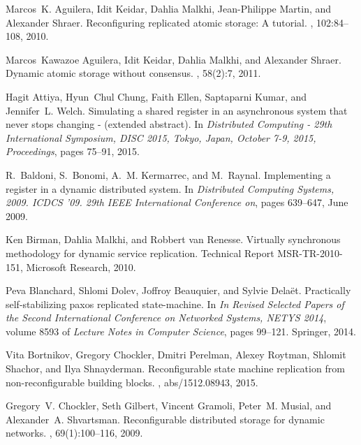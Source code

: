 \documentclass[11pt]{article}
\begin{document}
\begin{thebibliography}{10}

Marcos~K. Aguilera, Idit Keidar, Dahlia Malkhi, Jean{-}Philippe Martin, and
  Alexander Shraer.
\newblock Reconfiguring replicated atomic storage: {A} tutorial.
, 102:84--108, 2010.

Marcos~Kawazoe Aguilera, Idit Keidar, Dahlia Malkhi, and Alexander Shraer.
\newblock Dynamic atomic storage without consensus.
, 58(2):7, 2011.

Hagit Attiya, Hyun~Chul Chung, Faith Ellen, Saptaparni Kumar, and Jennifer~L.
  Welch.
\newblock Simulating a shared register in an asynchronous system that never
  stops changing - (extended abstract).
\newblock In {\em Distributed Computing - 29th International Symposium, {DISC}
  2015, Tokyo, Japan, October 7-9, 2015, Proceedings}, pages 75--91, 2015.

R.~Baldoni, S.~Bonomi, A.~M. Kermarrec, and M.~Raynal.
\newblock Implementing a register in a dynamic distributed system.
\newblock In {\em Distributed Computing Systems, 2009. ICDCS '09. 29th IEEE
  International Conference on}, pages 639--647, June 2009.

Ken Birman, Dahlia Malkhi, and Robbert van Renesse.
\newblock Virtually synchronous methodology for dynamic service replication.
\newblock Technical Report MSR-TR-2010-151, Microsoft Research, 2010.

Peva Blanchard, Shlomi Dolev, Joffroy Beauquier, and Sylvie Dela{\"{e}}t.
\newblock Practically self-stabilizing paxos replicated state-machine.
\newblock In {\em In Revised Selected Papers of the Second International
  Conference on Networked Systems, {NETYS} 2014}, volume 8593 of {\em Lecture
  Notes in Computer Science}, pages 99--121. Springer, 2014.

Vita Bortnikov, Gregory Chockler, Dmitri Perelman, Alexey Roytman, Shlomit
  Shachor, and Ilya Shnayderman.
\newblock Reconfigurable state machine replication from non-reconfigurable
  building blocks.
, abs/1512.08943, 2015.

Gregory~V. Chockler, Seth Gilbert, Vincent Gramoli, Peter~M. Musial, and
  Alexander~A. Shvartsman.
\newblock Reconfigurable distributed storage for dynamic networks.
, 69(1):100--116, 2009.


\end{thebibliography}
\end{document}
